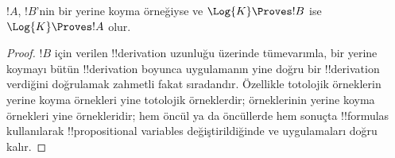\documentclass[../../../include/open-logic-section]{subfiles}
\begin{document}
\begin{prop}
  $!A$, $!B$'nin bir yerine koyma örneğiyse ve $\Log{K} \Proves !B$ ise
  $\Log{K} \Proves !A$ olur.
\end{prop}

\begin{proof}
  $!B$ için verilen !!{derivation} uzunluğu üzerinde tümevarımla, bir yerine
  koymayı bütün !!{derivation} boyunca uygulamanın yine doğru bir !!{derivation}
  verdiğini doğrulamak zahmetli fakat sıradandır. Özellikle totolojik
  örneklerin yerine koyma örnekleri yine totolojik örneklerdir;
   örneklerinin yerine koyma örnekleri
  yine  örnekleridir; hem öncül ya da
  öncüllerde hem sonuçta !!{formula}s kullanılarak !!{propositional variable}s
  değiştirildiğinde \MP{} ve \Nec{} uygulamaları doğru kalır.
\end{proof}
\end{document}
